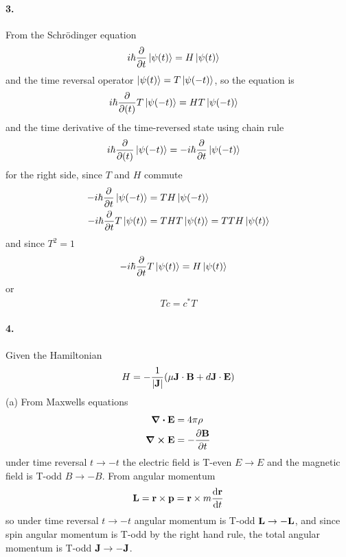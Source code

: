 \documentclass[../main.tex]{subfiles}
\begin{document}
\paragraph*{3.} From the Schr\"odinger equation
\begin{align*}
    i\hbar\pdv{t}\ket{\psi(t)} &= H \ket{\psi(t)}
\end{align*}
and the time reversal operator $\ket{\psi(t)} = T \ket{\psi(-t)}$, so the equation is
\begin{align*}
    i\hbar\pdv{(t)}T\ket{\psi(-t)} &= H T\ket{\psi(-t)}
\end{align*}
and the time derivative of the time-reversed state using chain rule
\begin{align*}
    i\hbar\pdv{(t)}\ket{\psi(-t)} &= -i\hbar\pdv{t}\ket{\psi(-t)}
\end{align*}
for the right side, since $T$ and $H$ commute
\begin{align*}
    -i\hbar\pdv{t}\ket{\psi(-t)} &= T H\ket{\psi(-t)} \\
    -i\hbar\pdv{t}T\ket{\psi(t)} &= T HT\ket{\psi(t)} = T T H \ket{\psi(t)}
\end{align*}
and since $T^2 = 1$
\begin{align*}
    -i\hbar\pdv{t}T\ket{\psi(t)} &= H \ket{\psi(t)}
\end{align*}
or
\begin{align*}
    T c = c^* T
\end{align*}

\paragraph*{4.} Given the Hamiltonian
\begin{align*}
    H = - \frac{1}{\abs{\vb J}} (\mu \vb J \cdot \vb B + d \vb J \cdot \vb E)
\end{align*}
(a) From Maxwells equations
\begin{align*}
    \div \vb E &= 4\pi \rho \\
    \curl \vb E &= -\pdv{\vb B}{t}
\end{align*}
under time reversal $t \to -t$ the electric field is T-even $E \to E$ and the magnetic field is T-odd
$B \to -B$. From angular momentum
\begin{align*}
    \vb L = \vb r \times \vb p = \vb r \times m \dv{\vb r}{t}
\end{align*}
so under time reversal $t \to -t$ angular momentum is T-odd $\vb L \to -\vb L$, and since spin 
angular momentum is T-odd by the right hand rule, the total angular momentum is T-odd $\vb J \to -\vb J$.
\end{document}

